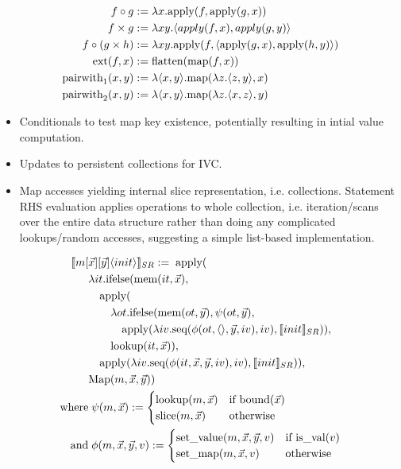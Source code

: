 \begin{align*}
f \circ g & := \lambda x. \mbox{apply}(f, \mbox{apply}(g,x))
\\
f \times g & := \lambda xy. {\langle apply(f, x), apply(g, y)\rangle}
\\
f \circ (g \times h) & := \lambda xy.
\mbox{apply}(f, {\langle\mbox{apply}(g, x), \mbox{apply}(h, y)\rangle})
\\
\mbox{ext}(f,x) & := \mbox{flatten}(\mbox{map}(f,x))
\\
\mbox{pairwith}_1(x,y) & := \lambda {\langle x,y\rangle}. \mbox{map}(\lambda z.{\langle z,y\rangle}, x)
\\
\mbox{pairwith}_2(x,y) & := \lambda {\langle x,y\rangle}. \mbox{map}(\lambda z.{\langle x,z\rangle}, y)
\end{align*}

\def \sr#1{\llbracket #1 \rrbracket_{SR}}

\begin{itemize}
  \item Conditionals to test map key existence, potentially resulting in
  intial value computation.
  \item Updates to persistent collections for IVC.
  \item Map accesses yielding internal slice representation, i.e. collections.
  Statement RHS evaluation applies operations to whole collection, i.e.
  iteration/scans over the entire data structure rather than doing any
  complicated lookups/random accesses, suggesting a simple list-based
  implementation.
\end{itemize}

\begin{align*}
\sr{m[ & \vec{x}][\vec{y}] \tuple{init}} := \; \apply(\\
  & \lambda it. \ifelse(\mem(it, \vec{x}), \\
  & \quad \apply(\\
  & \quad \quad
    \lambda ot. \ifelse(\mem(ot, \vec{y}), \psi(ot, \vec{y}),\\
  & \quad \quad \quad
    \apply(\lambda iv. \seq(\phi(ot,\tuple{},\vec{y},iv), iv), \sr{init})), \\
  & \quad \quad \lookup(it, \vec{x})), \\
  & \quad \apply(\lambda iv.
       \seq(\phi(it,\vec{x},\vec{y},iv), iv), \sr{init})),\\
  & \ktcmap(m,\vec{x},\vec{y}))\\
\mbox{where} & \; \psi(m,\vec{x}) := 
                        \begin{cases}
                        \lookup(m,\vec{x}) & \mbox{if bound($\vec{x}$)}\\
                        \slice(m,\vec{x})  & \mbox{otherwise}
                        \end{cases}\\
\mbox{and}   & \; \phi(m,\vec{x},\vec{y},v) :=
                        \begin{cases}
                        \setval(m, \vec{x}, \vec{y}, v) & \mbox{if is\_val($v$)}
                        \\
                        \setmap(m, \vec{x}, v) & \mbox{otherwise}
                        \end{cases}
\end{align*}

